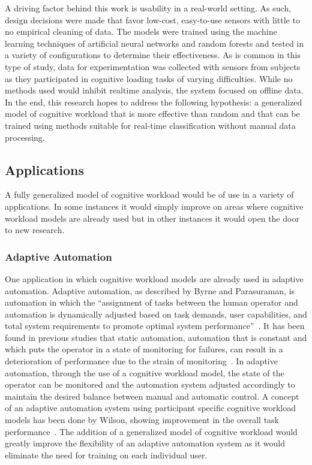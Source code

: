 \documentclass[11pt]{article}
\begin{document}
A driving factor behind this work is usability in a real-world setting. As such, design decisions were made that favor low-cost, easy-to-use sensors with little to no empirical cleaning of data. The models were trained using the machine learning techniques of artificial neural networks and random forests and tested in a variety of configurations to determine their effectiveness. As is common in this type of study, data for experimentation was collected with sensors from subjects as they participated in cognitive loading tasks of varying difficulties. While no methods used would inhibit realtime analysis, the system focused on offline data.  In the end, this research hopes to address the following hypothesis: a generalized model of cognitive workload that is more effective than random and that can be trained using methods suitable for real-time classification without manual data processing.

	\subsection{Applications}
	A fully generalized model of cognitive workload would be of use in a variety of applications. In some instances it would simply improve on areas where cognitive workload models are already used but in other instances it would open the door to new research.
	
		\subsubsection{Adaptive Automation}
		One application in which cognitive workload models are already used in adaptive automation. Adaptive automation, as described by Byrne and Parasuraman, is automation in which the  ``assignment of tasks between the human operator and automation is dynamically adjusted based on task demands, user capabilities, and total system requirements to promote optimal system performance''~\cite{Byrne}. It has been found in previous studies that static automation, automation that is constant and which puts the operator in a state of monitoring for failures, can result in a deterioration of performance due to the strain of monitoring~\cite{Parasuraman_1993, Parasuraman_1997}. In adaptive automation, through the use of a cognitive workload model, the state of the operator can be monitored and the automation system adjusted accordingly to maintain the desired balance between manual and automatic control. A concept of an adaptive automation system using participant specific cognitive workload models has been done by Wilson, showing improvement in the overall task performance~\cite{Wilson_2005}. The addition of a generalized model of cognitive workload would greatly improve the flexibility of an adaptive automation system as it would eliminate the need for training on each individual user.
		
\end{document}
